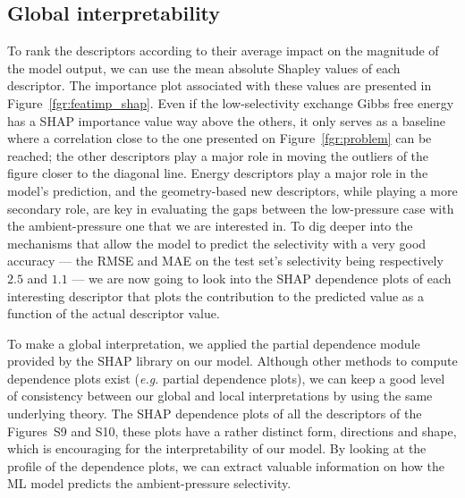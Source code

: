 \documentclass[main]{subfiles}
\begin{document}
\subsection{Global interpretability}

To rank the descriptors according to their average impact on the magnitude of the model output, we can use the mean absolute Shapley values of each descriptor. The importance plot associated with these values are presented in Figure~\ref{fgr:featimp_shap}. Even if the low-selectivity exchange Gibbs free energy has a SHAP importance value way above the others, it only serves as a baseline where a correlation close to the one presented on Figure~\ref{fgr:problem} can be reached; the other descriptors play a major role in moving the outliers of the figure closer to the diagonal line. Energy descriptors play a major role in the model's prediction, and the geometry-based new descriptors, while playing a more secondary role, are key in evaluating the gaps between the low-pressure case with the ambient-pressure one that we are interested in. To dig deeper into the mechanisms that allow the model to predict the selectivity with a very good accuracy --- the RMSE and MAE on the test set's selectivity being respectively $2.5$ and $1.1$ --- we are now going to look into the SHAP dependence plots of each interesting descriptor that plots the contribution to the predicted value as a function of the actual descriptor value.

To make a global interpretation, we applied the partial dependence module provided by the SHAP library on our model. Although other methods to compute dependence plots exist (\emph{e.g.} partial dependence plots),\autocite{molnar2020interpretable} we can keep a good level of consistency between our global and local interpretations by using the same underlying theory. The SHAP dependence plots of all the descriptors of the Figures~S9 and S10, these plots have a rather distinct form, directions and shape, which is encouraging for the interpretability of our model. By looking at the profile of the dependence plots, we can extract valuable information on how the ML model predicts the ambient-pressure selectivity.
\end{document}
